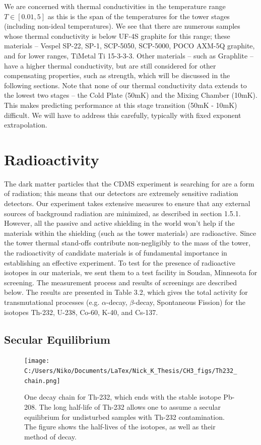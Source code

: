 \documentclass{report}
\begin{document}
We are concerned with thermal conductivities in the temperature range $T \in [0.01,5]$ as this is the span of the temperatures for the tower stages (including non-ideal temperatures). We see that there are numerous samples whose thermal conductivity is below UF-4S graphite for this range; these materials -- Vespel SP-22, SP-1, SCP-5050, SCP-5000, POCO AXM-5Q graphite, and for lower ranges, TiMetal Ti 15-3-3-3. Other materials -- such as Graphlite -- have a higher thermal conductivity, but are still considered for other compensating properties, such as strength, which will be discussed in the following sections. Note that none of our thermal conductivity data extends to the lowest two stages -- the Cold Plate (50mK) and the Mixing Chamber (10mK). This makes predicting performance at this stage transition (50mK - 10mK) difficult. We will have to address this carefully, typically with fixed exponent extrapolation. 



\section{Radioactivity}

The dark matter particles that the CDMS experiment is searching for are a form of radiation; this means that our detectors are extremely sensitive radiation detectors. Our experiment takes extensive measures to ensure that any external sources of background radiation are minimized, as described in section 1.5.1. However, all the passive and active shielding in the world won't help if the materials within the shielding (such as the tower materials) are radioactive. Since the tower thermal stand-offs contribute non-negligibly to the mass of the tower, the radioactivity of candidate materials is of fundamental importance in establishing an effective experiment. To test for the presence of radioactive isotopes in our materials, we sent them to a test facility in Soudan, Minnesota for screening. The measurement process and results of screenings are described below. The results are presented in Table 3.2, which gives the total activity for transmutational processes (e.g. $\alpha$-decay, $\beta$-decay, Spontaneous Fission) for the isotopes Th-232, U-238, Co-60, K-40, and Cs-137.

\subsection{Secular Equilibrium}

\begin{figure}
\centering
\texttt{[image: C:/Users/Niko/Documents/LaTex/Nick\_K\_Thesis/CH3\_figs/Th232\_chain.png]}
\caption{One decay chain for Th-232, which ends with the stable isotope Pb-208. The long half-life of Th-232 allows one to assume a secular equilibrium for undisturbed samples with Th-232 contamination. The figure shows the half-lives of the isotopes, as well as their method of decay.}
\end{figure}
\end{document}
